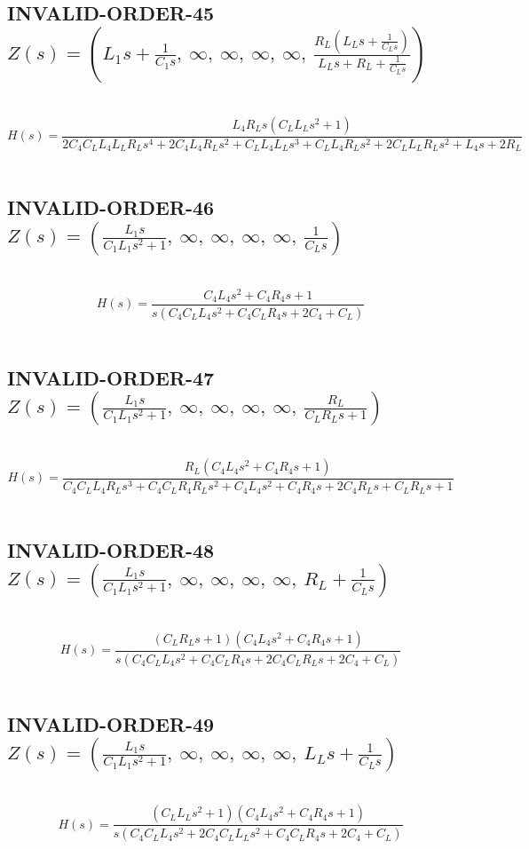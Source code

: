 \documentclass{article}
\begin{document}
\subsection{INVALID-ORDER-45 $Z(s) = \left( L_{1} s + \frac{1}{C_{1} s}, \  \infty, \  \infty, \  \infty, \  \infty, \  \frac{R_{L} \left(L_{L} s + \frac{1}{C_{L} s}\right)}{L_{L} s + R_{L} + \frac{1}{C_{L} s}}\right)$ } \ 
\textbf{\[H(s) = \frac{L_{4} R_{L} s \left(C_{L} L_{L} s^{2} + 1\right)}{2 C_{4} C_{L} L_{4} L_{L} R_{L} s^{4} + 2 C_{4} L_{4} R_{L} s^{2} + C_{L} L_{4} L_{L} s^{3} + C_{L} L_{4} R_{L} s^{2} + 2 C_{L} L_{L} R_{L} s^{2} + L_{4} s + 2 R_{L}}\] } \ 
\subsection{INVALID-ORDER-46 $Z(s) = \left( \frac{L_{1} s}{C_{1} L_{1} s^{2} + 1}, \  \infty, \  \infty, \  \infty, \  \infty, \  \frac{1}{C_{L} s}\right)$ } \ 
\textbf{\[H(s) = \frac{C_{4} L_{4} s^{2} + C_{4} R_{4} s + 1}{s \left(C_{4} C_{L} L_{4} s^{2} + C_{4} C_{L} R_{4} s + 2 C_{4} + C_{L}\right)}\] } \ 
\subsection{INVALID-ORDER-47 $Z(s) = \left( \frac{L_{1} s}{C_{1} L_{1} s^{2} + 1}, \  \infty, \  \infty, \  \infty, \  \infty, \  \frac{R_{L}}{C_{L} R_{L} s + 1}\right)$ } \ 
\textbf{\[H(s) = \frac{R_{L} \left(C_{4} L_{4} s^{2} + C_{4} R_{4} s + 1\right)}{C_{4} C_{L} L_{4} R_{L} s^{3} + C_{4} C_{L} R_{4} R_{L} s^{2} + C_{4} L_{4} s^{2} + C_{4} R_{4} s + 2 C_{4} R_{L} s + C_{L} R_{L} s + 1}\] } \ 
\subsection{INVALID-ORDER-48 $Z(s) = \left( \frac{L_{1} s}{C_{1} L_{1} s^{2} + 1}, \  \infty, \  \infty, \  \infty, \  \infty, \  R_{L} + \frac{1}{C_{L} s}\right)$ } \ 
\textbf{\[H(s) = \frac{\left(C_{L} R_{L} s + 1\right) \left(C_{4} L_{4} s^{2} + C_{4} R_{4} s + 1\right)}{s \left(C_{4} C_{L} L_{4} s^{2} + C_{4} C_{L} R_{4} s + 2 C_{4} C_{L} R_{L} s + 2 C_{4} + C_{L}\right)}\] } \ 
\subsection{INVALID-ORDER-49 $Z(s) = \left( \frac{L_{1} s}{C_{1} L_{1} s^{2} + 1}, \  \infty, \  \infty, \  \infty, \  \infty, \  L_{L} s + \frac{1}{C_{L} s}\right)$ } \ 
\textbf{\[H(s) = \frac{\left(C_{L} L_{L} s^{2} + 1\right) \left(C_{4} L_{4} s^{2} + C_{4} R_{4} s + 1\right)}{s \left(C_{4} C_{L} L_{4} s^{2} + 2 C_{4} C_{L} L_{L} s^{2} + C_{4} C_{L} R_{4} s + 2 C_{4} + C_{L}\right)}\] } \ 
\end{document}
